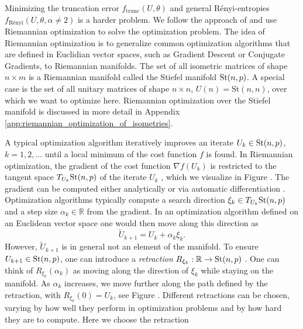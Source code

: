 Minimizing the truncation error $f_\text{trunc}\left(U,\theta\right)$ and general Rényi-entropies $f_\text{Rényi}\left(U,\theta,\alpha\neq2\right)$ is a harder problem. We follow the approach of \cite{cite:isometric_tensor_network_states_in_two_dimensions, cite:efficient_simulation_of_dynamics_in_two_dimensional_quantum_spin_systems} and use Riemannian optimization \cite{cite:optimization_on_matrix_manifolds, cite:optimization_techniques_on_riemannian_manifolds, cite:riemannian_optimization_isometric_tensor_networks, cite:riemannian_geometry_automatic_differentiation_quantum_physics, cite:pymanopt} to solve the optimization problem. The idea of Riemannian optimization is to generalize common optimization algorithms that are defined in Euclidian vector spaces, such as Gradient Descent or Conjugate Gradients, to Riemannian manifolds. The set of all isometric matrices of shape $n\times m$ is a Riemannian manifold called the Stiefel manifold $\text{St}(n,p)$. A special case is the set of all unitary matrices of shape $n\times n$, $U(n)=\text{St}(n, n)$, over which we want to optimize here. Riemannian optimization over the Stiefel manifold is discussed in more detail in Appendix \ref{app:riemannian_optimization_of_isometries}. \par
A typical optimization algorithm iteratively improves an iterate $U_k\in\text{St}(n,p)$, $k=1,2,\dots$ until a local minimum of the cost function $f$ is found. In Riemannian optimization, the gradient of the cost function $\nabla f\left(U_k\right)$ is restricted to the tangent space $T_{U_k}\text{St}(n,p)$ of the iterate $U_k$ \cite{cite:optimization_on_matrix_manifolds}, which we visualize in Figure . The gradient can be computed either analytically or via automatic differentiation \cite{cite:riemannian_geometry_automatic_differentiation_quantum_physics, cite:pymanopt}. Optimization algorithms typically compute a search direction $\xi_k\in T_{U_k}\text{St}(n,p)$ and a step size $\alpha_k \in \mathbb{R}$ from the gradient. In an optimization algorithm defined on an Euclidean vector space one would then move along this direction as
\begin{equation}
	\tilde{U}_{k+1} = U_k + \alpha_k\xi_k.
\end{equation}
However, $\tilde{U}_{k+1}$ is in general not an element of the manifold. To ensure $U_{k+1}\in\text{St}(n,p)$, one can introduce a \textit{retraction} $R_{\xi_k}:\mathbb{R}\to\text{St}(n,p)$ \cite{cite:optimization_on_matrix_manifolds}. One can think of $R_{\xi_k}(\alpha_k)$ as moving along the direction of $\xi_k$ while staying on the manifold. As $\alpha_k$ increases, we move further along the path defined by the retraction, with $R_{\xi_k}(0) = U_k$, see Figure . Different retractions can be chosen, varying by how well they perform in optimization problems and by how hard they are to compute. Here we choose the retraction
